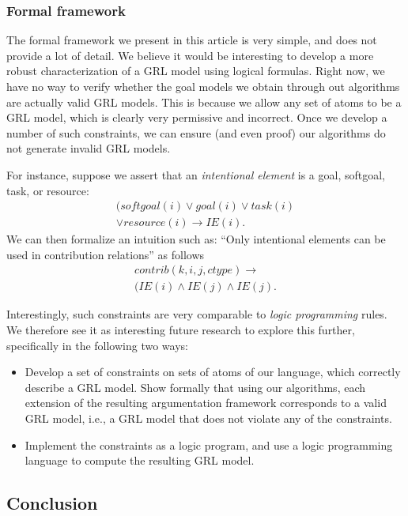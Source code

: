 \subsubsection*{Formal framework}

The formal framework we present in this article is very simple, and does not provide a lot of detail. We believe it would be interesting to develop a more robust characterization of a GRL model using logical formulas. Right now, we have no way to verify whether the goal models we obtain through out algorithms are actually valid GRL models. This is because we allow any set of atoms to be a GRL model, which is clearly very permissive and incorrect. Once we develop a number of such constraints, we can ensure (and even proof) our algorithms do not generate invalid GRL models. 

For instance, suppose we assert that an \emph{intentional element} is a goal, softgoal, task, or resource: \begin{align*}
(softgoal(i)\vee goal(i)\vee task(i)\\
\vee resource(i)\rightarrow IE(i).
\end{align*}
We can then formalize an intuition such as: ``Only intentional elements can be used in contribution relations'' as follows
\begin{align*}
contrib(k,i,j,ctype)\rightarrow \\
(IE(i)\wedge IE(j)\wedge IE(j).
\end{align*}

Interestingly, such constraints are very comparable to \emph{logic programming} rules. We therefore see it as interesting future research to explore this further, specifically in the following two ways:
\begin{itemize}
\item Develop a set of constraints on sets of atoms of our language, which correctly describe a GRL model. Show formally that using our algorithms, each extension of the resulting argumentation framework corresponds to a valid GRL model, i.e., a GRL model that does not violate any of the constraints.
\item Implement the constraints as a logic program, and use a logic programming language to compute the resulting GRL model.
\end{itemize}


\subsection{Conclusion}

